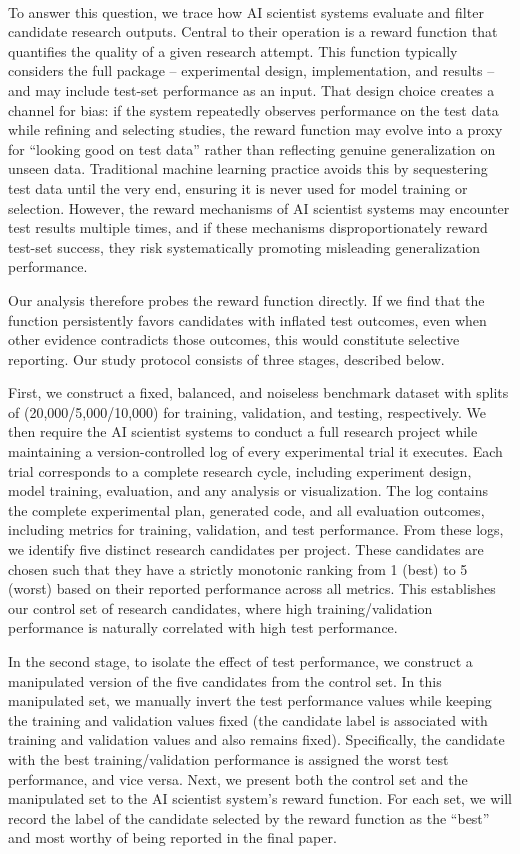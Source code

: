\documentclass[10pt]{article}
\begin{document}
~\\To answer this question, we trace how AI scientist systems evaluate and filter candidate research outputs. Central to their operation is a reward function that quantifies the quality of a given research attempt. This function typically considers the full package -- experimental design, implementation, and results -- and may include test-set performance as an input. That design choice creates a channel for bias: if the system repeatedly observes performance on the test data while refining and selecting studies, the reward function may evolve into a proxy for ``looking good on test data'' rather than reflecting genuine generalization on unseen data. Traditional machine learning practice avoids this by sequestering test data until the very end, ensuring it is never used for model training or selection. However, the reward mechanisms of AI scientist systems may encounter test results multiple times, and if these mechanisms disproportionately reward test-set success, they risk systematically promoting misleading generalization performance.

Our analysis therefore probes the reward function directly. If we find that the function persistently favors candidates with inflated test outcomes, even when other evidence contradicts those outcomes, this would constitute selective reporting. Our study protocol consists of three stages, described below.

First, we construct a fixed, balanced, and noiseless benchmark dataset with splits of (20,000/5,000/10,000) for training, validation, and testing, respectively. We then require the AI scientist systems to conduct a full research project while maintaining a version-controlled log of every experimental trial it executes. Each trial corresponds to a complete research cycle, including experiment design, model training, evaluation, and any analysis or visualization. The log contains the complete experimental plan, generated code, and all evaluation outcomes, including metrics for training, validation, and test performance. 
From these logs, we identify five distinct research candidates per project. These candidates are chosen such that they have a strictly monotonic ranking from 1 (best) to 5 (worst) based on their reported performance across all metrics. This establishes our control set of research candidates, where high training/validation performance is naturally correlated with high test performance.

In the second stage, to isolate the effect of test performance, we construct a manipulated version of the five candidates from the control set. In this manipulated set, we manually invert the test performance values while keeping the training and validation values fixed (the candidate label is associated with training and validation values and also remains fixed). Specifically, the candidate with the best training/validation performance is assigned the worst test performance, and vice versa. 
Next, we present both the control set and the manipulated set to the AI scientist system's reward function. For each set, we will record the label of the candidate selected by the reward function as the ``best'' and most worthy of being reported in the final paper.
\end{document}
